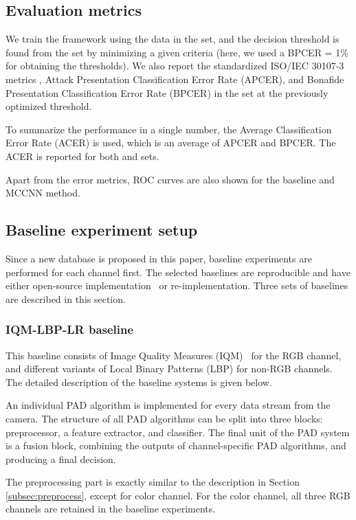 \documentclass[journal]{IEEEtran}
\begin{document}
\subsection{Evaluation metrics}

We train the framework using the data in the  set, and the decision threshold is found from the  set by minimizing a given criteria (here, we used a BPCER = 1\% for obtaining the thresholds). We also report the standardized ISO/IEC 30107-3 metrics \cite{ISO}, Attack Presentation Classification Error Rate (APCER),  and Bonafide Presentation Classification Error Rate (BPCER) in the  set at the previously optimized threshold.

To summarize the performance in a single number, the Average Classification Error Rate (ACER) is used, which is an average of APCER and BPCER. The ACER is reported for both  and  sets.

Apart from the error metrics, ROC curves are also shown for the baseline and MCCNN method.


\subsection{Baseline experiment setup}

Since a new database is proposed in this paper, baseline experiments are performed for each channel first. The selected baselines are reproducible and have either open-source implementation~\cite{nikisins2018effectiveness} or re-implementation. Three sets of baselines are described in this section.

\subsubsection{IQM-LBP-LR baseline}


This baseline consists of Image Quality Measures (IQM)~\cite{galbally2014image} for the RGB channel, and different variants of Local Binary Patterns (LBP) for non-RGB channels. The detailed description of the baseline systems is given below.

An individual PAD algorithm is implemented for every data stream from the camera. The structure of all PAD algorithms can be split into three blocks: preprocessor, a feature extractor, and classifier. The final unit of the PAD system is a fusion block, combining the outputs of channel-specific PAD algorithms, and producing a final decision.

The preprocessing part is exactly similar to the description in Section \ref{subsec:preprocess}, except for color channel. For the color channel, all three RGB channels are retained in the baseline experiments.
\end{document}
